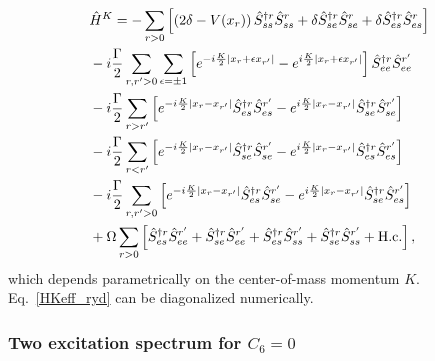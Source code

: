 \documentclass[pra,twocolumn,showpacs,preprintnumbers,amsmath,amssymb]{revtex4-1}
\begin{document}
\begin{equation}\label{HKeff_ryd}
\begin{split}
&\hat H^K=-\sum_{r>0}\left[ \left(2\delta -V(x_r)\right) \hat S^{\dagger r}_{ss}\hat S^{r}_{ss}+ \delta \hat S^{\dagger r}_{se}\hat S^{r}_{se}+\delta \hat S^{\dagger r}_{es}\hat S^{r}_{es}\right]\\
&-i\frac{\Gamma}{2}\sum_{r,r'>0}\sum_{\epsilon=\pm1}\left[e^{-i\frac{K}{2}|x_r+\epsilon x_{r'}|}-e^{i\frac{K}{2}|x_r+\epsilon x_{r'}|}\right]\hat S^{\dagger r}_{ee}\hat S^{r'}_{ee}\\
&-i\frac{\Gamma}{2}\sum_{r>r'}\left[e^{-i\frac{K}{2}|x_r-x_{r'}|}\hat S^{\dagger r}_{es}\hat S^{r'}_{es}-e^{i\frac{K}{2}|x_r-x_{r'}|}\hat S^{\dagger r}_{se}\hat S^{r'}_{se}\right]\\
&-i\frac{\Gamma}{2}\sum_{r<r'}\left[e^{-i\frac{K}{2}|x_r-x_{r'}|}\hat S^{\dagger r}_{se}\hat S^{r'}_{se}-e^{i\frac{K}{2}|x_r-x_{r'}|}\hat S^{\dagger r}_{es}\hat S^{r'}_{es}\right]\\
&-i\frac{\Gamma}{2}\sum_{r,r'>0}\left[e^{-i\frac{K}{2}|x_r-x_{r'}|}\hat S^{\dagger r}_{es}\hat S^{r'}_{se}-e^{i\frac{K}{2}|x_r-x_{r'}|}\hat S^{\dagger r}_{se}\hat S^{r'}_{es}\right]\\
&+\Omega\sum_{r>0}\left[\hat S^{\dagger r}_{es}\hat S^{r'}_{ee}+\hat S^{\dagger r}_{se}\hat S^{r'}_{ee}+\hat S^{\dagger r}_{es}\hat S^{r'}_{ss}+\hat S^{\dagger r}_{se}\hat S^{r'}_{ss}+\rm H.c. \right],
\end{split}
\end{equation}
which depends parametrically on the center-of-mass momentum $K$. Eq.~\eqref{HKeff_ryd} can be diagonalized numerically.

\subsubsection{Two excitation spectrum for $C_6=0$}\label{App.RydEIT}
\end{document}
